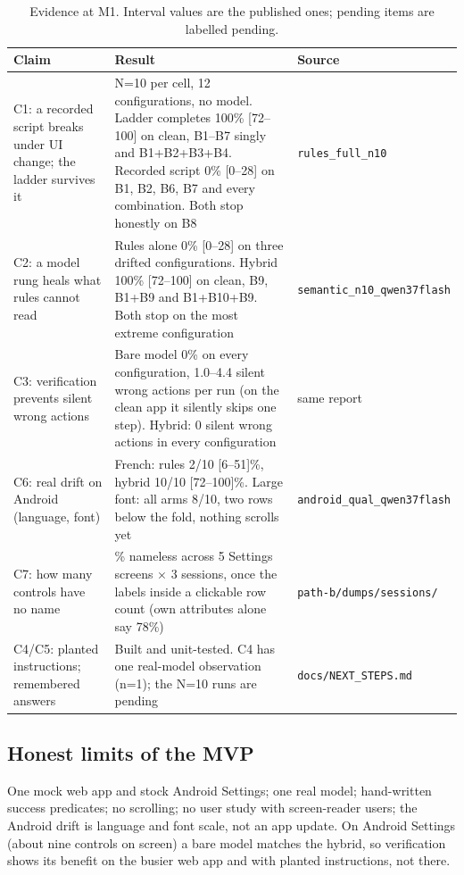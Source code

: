 \documentclass[11pt,a4paper]{article}
\begin{document}
\begin{table}[h]\centering\small
\begin{tabularx}{\textwidth}{@{}>{\raggedright\arraybackslash}p{3.0cm} >{\raggedright\arraybackslash}X >{\raggedright\arraybackslash}p{3.5cm}@{}}
\toprule
Claim & Result & Source\\\midrule
C1: a recorded script breaks under UI change; the ladder survives it & N=10 per cell, 12 configurations, no model. Ladder completes 100\% [72--100] on clean, B1--B7 singly and B1+B2+B3+B4. Recorded script 0\% [0--28] on B1, B2, B6, B7 and every combination. Both stop honestly on B8 & {\scriptsize\texttt{rules\_full\_n10}}\\
C2: a model rung heals what rules cannot read & Rules alone 0\% [0--28] on three drifted configurations. Hybrid 100\% [72--100] on clean, B9, B1+B9 and B1+B10+B9. Both stop on the most extreme configuration & {\scriptsize\texttt{semantic\_n10\_qwen37flash}}\\
C3: verification prevents silent wrong actions & Bare model 0\% on every configuration, 1.0--4.4 silent wrong actions per run (on the clean app it silently skips one step). Hybrid: 0 silent wrong actions in every configuration & same report\\
C6: real drift on Android (language, font) & French: rules 2/10 [6--51]\%, hybrid 10/10 [72--100]\%. Large font: all arms 8/10, two rows below the fold, nothing scrolls yet & {\scriptsize\texttt{android\_qual\_qwen37flash}}\\
C7: how many controls have no name & 2\% nameless across 5 Settings screens $\times$ 3 sessions, once the labels inside a clickable row count (own attributes alone say 78\%) & {\scriptsize\texttt{path-b/dumps/sessions/}}\\
C4/C5: planted instructions; remembered answers & Built and unit-tested. C4 has one real-model observation (n=1); the N=10 runs are pending & {\scriptsize\texttt{docs/NEXT\_STEPS.md}}\\
\bottomrule
\end{tabularx}
\caption{Evidence at M1. Interval values are the published ones; pending items are labelled pending.}
\end{table}

\subsection{Honest limits of the MVP}
One mock web app and stock Android Settings; one real model; hand-written success predicates; no scrolling; no user study with screen-reader users; the Android drift is language and font scale, not an app update. On Android Settings (about nine controls on screen) a bare model matches the hybrid, so verification shows its benefit on the busier web app and with planted instructions, not there.
\end{document}
